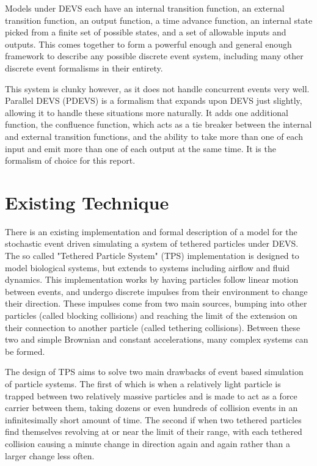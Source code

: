 \documentclass[conference]{IEEEtran}
\begin{document}
Models under DEVS each have an internal transition function, an external transition function, an output function, a time advance function, an internal state picked from a finite set of possible states, and a set of allowable inputs and outputs. This comes together to form a powerful enough and general enough framework to describe any possible discrete event system, including many other discrete event formalisms in their entirety. 

This system is clunky however, as it does not handle concurrent events very well. Parallel DEVS (PDEVS) is a formalism that expands upon DEVS just slightly, allowing it to handle these situations more naturally\cite{pdevs}. It adds one additional function, the confluence function, which acts as a tie breaker between the internal and external transition functions, and the ability to take more than one of each input and emit more than one of each output at the same time. It is the formalism of choice for this report.

\section{Existing Technique}

There is an existing implementation and formal description of a model for the stochastic event driven simulating a system of tethered particles under DEVS\cite{TPS-thesis}\cite{TPS-article}. The so called "Tethered Particle System" (TPS) implementation is designed to model biological systems, but extends to systems including airflow and fluid dynamics. This implementation works by having particles follow linear motion between events, and undergo discrete impulses from their environment to change their direction. These impulses come from two main sources, bumping into other particles (called blocking collisions) and reaching the limit of the extension on their connection to another particle (called tethering collisions). Between these two and simple Brownian and constant accelerations, many complex systems can be formed. 

The design of TPS aims to solve two main drawbacks of event based simulation of particle systems. The first of which is when a relatively light particle is trapped between two relatively massive particles and is made to act as a force carrier between them, taking dozens or even hundreds of collision events in an infinitesimally short amount of time. The second if when two tethered particles find themselves revolving at or near the limit of their range, with each tethered collision causing a minute change in direction again and again rather than a larger change less often.
\end{document}
